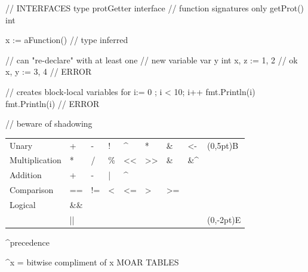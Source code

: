 \documentclass[10pt]{article}
\begin{document}
\begin{minipage}[t]{.25\textwidth}
\begin{codebox}[Declaration]
\begin{gocode}
            // INTERFACES
            type protGetter interface {
                // function signatures only
                getProt() int
            }
        \end{gocode}
        \begin{gocode}
            x := aFunction() // type inferred

            // can "re-declare" with at least one
            // new variable
            var y int
            x, z := 1, 2 // ok
            x, y := 3, 4 // ERROR

            // creates block-local variables
            for i:= 0 ; i < 10; i++ {
                fmt.Println(i)
            }
            fmt.Println(i) // ERROR

            // beware of shadowing
        \end{gocode}
    \end{codebox}
\end{minipage}%
\begin{minipage}[t]{.25\textwidth}
    \begin{codebox}[Operators]
        \setlength{\tabcolsep}{2pt}
        \begin{postscript}
		\begin{tabular}{@{}l|llllllll@{}}
            Unary & +  & -  & ! & \textasciicircum & * & \& & <- &\pnode(0,5pt){B}\\
			Multiplication & * & / & \% & << & >> & \& & \&\textasciicircum&\\
			Addition & + & - & | & \textasciicircum &&&&\\
			Comparison & == & != & < & <= & > & >= &&\\
			Logical & \&\& &&&&&&&\\
					& || &&&&&&&\pnode(0,-2pt){E}
		\bottomrule
		\end{tabular}
		^{precedence}
		\end{postscript}
            \textasciicircum x = bitwise compliment of x
		MOAR TABLES
    \end{codebox}
\end{minipage}%
\end{document}
